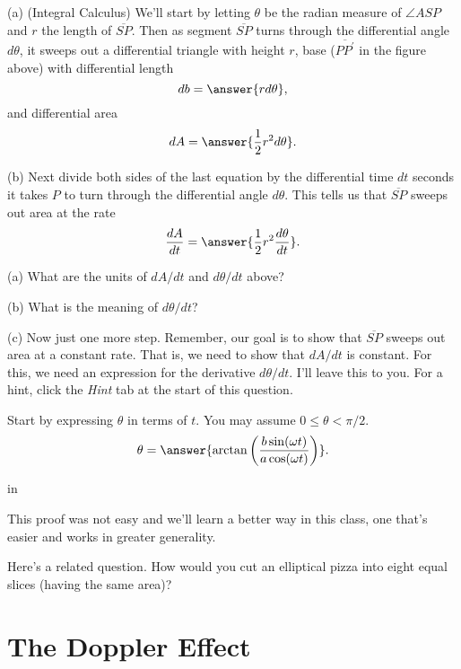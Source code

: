 \documentclass{ximera}
\newcommand{\pskip}{\vskip 0.1 in}
\begin{document}
\begin{question}  \label{Qdf4t5tht5544}
(a) (Integral Calculus) We'll start by letting $\theta$ be the radian measure of $\angle ASP$ and $r$ the length of $\overline{SP}$. Then as segment $\overline{SP}$ turns through the differential angle $d\theta$, it sweeps out
a differential triangle with height $r$, base ($\overline{PP^\prime}$ in the figure above) with differential length
\[
             db = \answer{r d\theta},
\]
and differential area
\[
    dA = \answer{\frac{1}{2}r^2 d\theta} .
\]

(b) Next divide both sides of the last equation by the differential time $dt$ seconds it takes $P$ to turn through the differential angle $d\theta$. This tells us that $\overline{SP}$ sweeps out area at the rate
\[
  \frac{dA}{dt} = \answer{\frac{1}{2}r^2 \frac{d\theta}{dt}} .
\]

\begin{freeResponse}
(a) What are the units of $dA/dt$ and $d\theta/dt$ above? 

(b) What is the meaning of $d\theta/dt$?
\end{freeResponse}

(c) Now just one more step. Remember, our goal is to show that $\overline{SP}$ sweeps out area at a constant rate. That is, we need to show that $dA/dt$ is constant. For this, we need an expression for the derivative $d\theta/dt$. I'll leave this to you. For a hint, click the \emph{Hint} tab at the start of this question.

\begin{hint}
Start by expressing $\theta$ in terms of $t$. You may assume $0 \leq \theta < \pi/2$. 
\[
    \theta = \answer{\arctan\left( \frac{b\sin (\omega t)}{a \cos (\omega t)}\right)} .
\]
\end{hint}

\pskip

This proof was not easy and we'll learn a better way in this class, one that's easier and works in greater generality.

\begin{freeResponse}   \label{Q:L98d7g33}
Here's a related question. How would you cut an elliptical pizza into eight equal slices (having the same area)?
\end{freeResponse}


\end{question}

\section*{The Doppler Effect}
\end{document}
